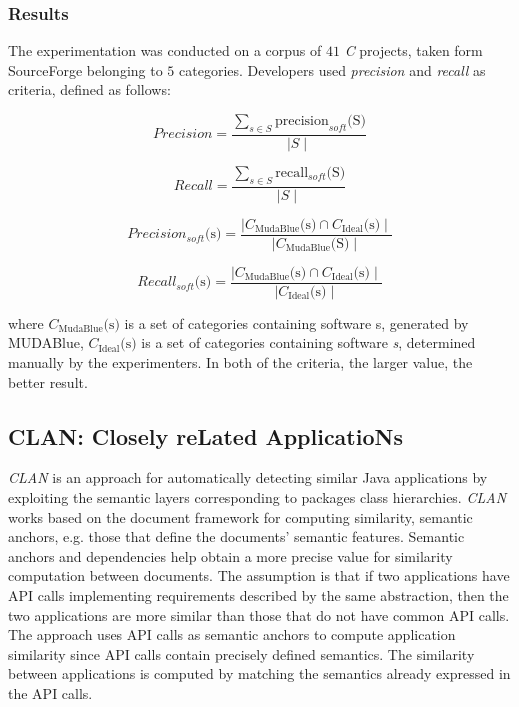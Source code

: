 \subsubsection{Results}
The experimentation was conducted on a corpus of $41$ \emph{C} projects, taken form SourceForge belonging to $5$ categories.
Developers used \emph{precision} and \emph{recall} as criteria, defined as follows:

\begin{equation}
Precision = \frac{\sum_{s\in S}\text{precision}_{soft}\text{(S)}}  {\mid S \mid}
\end{equation}

\begin{equation}
Recall = \frac{\sum_{s\in S}\text{recall}_{soft}\text{(S)}}  {\mid S \mid}
\end{equation}

\begin{equation}
Precision_{soft}\text{(s)} = \frac{\mid C_\text{MudaBlue}\text{(s)} \cap C_\text{Ideal}\text{(s)} \mid}  {\mid C_\text{MudaBlue}\text{(S)} \mid}
\end{equation}

\begin{equation}
Recall_{soft}\text{(s)} = \frac{\mid C_\text{MudaBlue}\text{(s)} \cap C_\text{Ideal}\text{(s)} \mid}  {\mid C_\text{Ideal}\text{(s)} \mid}
\end{equation}

where $C_\text{MudaBlue}\text{(s)}$ is a set of categories containing software s, generated by MUDABlue, $C_\text{Ideal}\text{(s)}$ is a set of categories containing software \emph{s}, determined manually by the experimenters. In both of the criteria, the larger value,
the better result.

\clearpage



\subsection{CLAN:  Closely reLated ApplicatioNs}\label{sec:clan}

\textit{CLAN} \cite{McMillan:2012:DSS:2337223.2337267} is an approach for automatically detecting similar Java applications by exploiting the semantic layers corresponding to packages class hierarchies. \textit{CLAN} works based on the document framework for computing similarity, semantic anchors, e.g. those that define the documents' semantic features. Semantic anchors and dependencies help obtain a more precise value for similarity computation between documents. The assumption is that if two applications have API calls implementing requirements described by the same abstraction, then the two applications are more similar than those that do not have common API calls. The approach uses API calls as semantic anchors to compute application similarity since API calls contain precisely defined semantics. The similarity between applications is computed by matching the semantics already expressed in the API calls.

